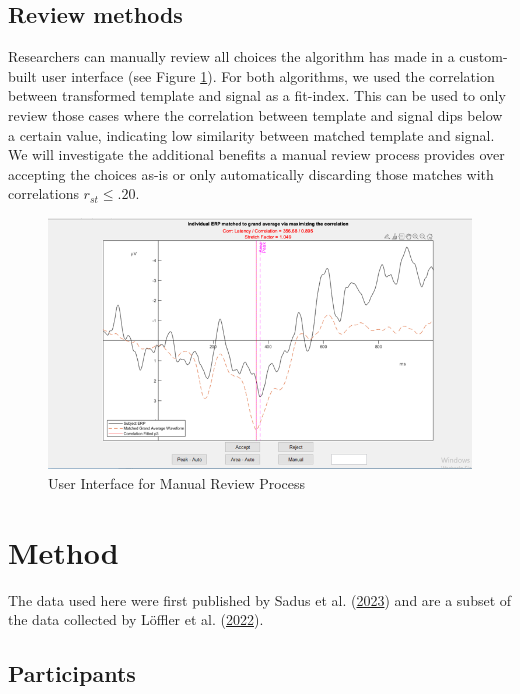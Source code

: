 \documentclass[
  man]{apa7}
\begin{document}
\hypertarget{review-methods}{%
\subsection{Review methods}\label{review-methods}}

Researchers can manually review all choices the algorithm has made in a custom-built user interface (see Figure \ref{fig:review-gui-example}). For both algorithms, we used the correlation between transformed template and signal as a fit-index. This can be used to only review those cases where the correlation between template and signal dips below a certain value, indicating low similarity between matched template and signal. We will investigate the additional benefits a manual review process provides over accepting the choices as-is or only automatically discarding those matches with correlations \(r_{st} \le .20\).



\begin{figure}
\includegraphics[width=0.75\linewidth]{images/review_gui_example} \caption{User Interface for Manual Review Process}\label{fig:review-gui-example}
\end{figure}

\hypertarget{method}{%
\section{Method}\label{method}}

The data used here were first published by Sadus et al. (\protect\hyperlink{ref-sadus2023multiverse}{2023}) and are a subset of the data collected by Löffler et al. (\protect\hyperlink{ref-loffler2022common}{2022}).

\hypertarget{participants}{%
\subsection{Participants}\label{participants}}
\end{document}
